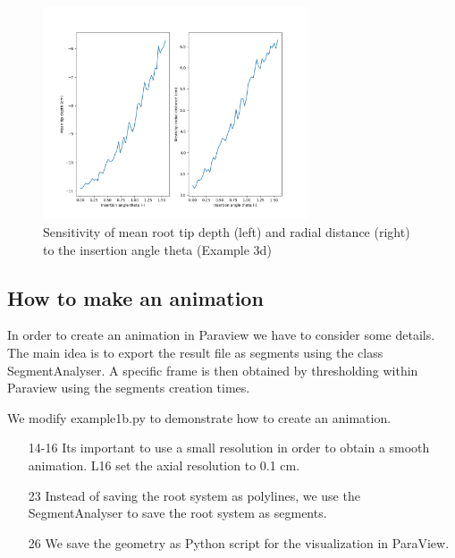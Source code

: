 \documentclass[a4paper]{article}
\begin{document}
\begin{figure}
\centering
\includegraphics[width=0.7\textwidth]{example_4b.png}
\caption{Sensitivity of mean root tip depth (left) and radial distance (right) to the insertion angle theta (Example 3d) } \label{fig:sa}
\end{figure}

\subsection{How to make an animation}

In order to create an animation in Paraview we have to consider some details. 
The main idea is to export the result file as segments using the class SegmentAnalyser. 
A specific frame is then obtained by thresholding within Paraview using the segments creation times. 

We modify example1b.py to demonstrate how to create an animation.

 

\begin{itemize}

\item[14-16] Its important to use a small resolution in order to obtain a smooth animation. L16 set the axial resolution to 0.1 cm. 

\item[23] Instead of saving the root system as polylines, we use the SegmentAnalyser to save the root system as segments.

\item[26] We save the geometry as Python script for the visualization in ParaView.

\end{itemize}
\end{document}
